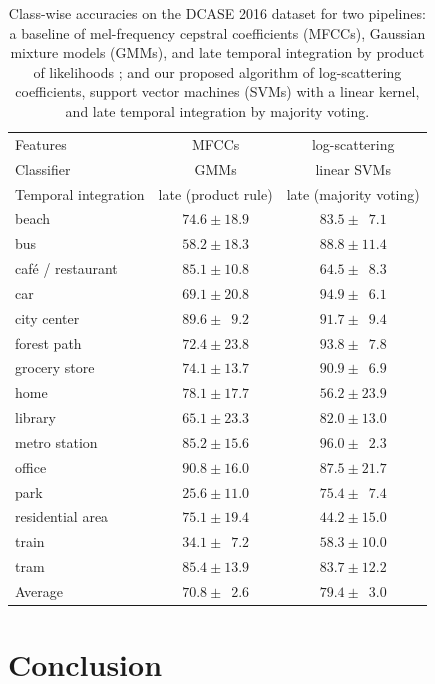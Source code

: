 \documentclass[journal]{IEEEtran}
\begin{document}
\begin{table}
\begin{center}
\begin{tabular}{lcc}
Features & MFCCs & log-scattering \\
Classifier  & GMMs    & linear SVMs \\
Temporal integration & late (product rule) & late (majority voting) \\
\midrule
beach & $74.6 \pm 18.9$ & $83.5 \pm \phantom{0}7.1$ \\
bus & $58.2 \pm 18.3$ & $88.8 \pm 11.4$ \\
caf\'{e} / restaurant & $85.1 \pm 10.8$ & $64.5 \pm \phantom{0}8.3$ \\
car & $69.1 \pm 20.8$ & $94.9 \pm \phantom{0}6.1$ \\
city center & $89.6 \pm \phantom{0}9.2$ & $91.7 \pm \phantom{0}9.4$ \\
forest path & $72.4 \pm 23.8$ & $93.8 \pm \phantom{0}7.8$ \\
grocery store & $74.1 \pm 13.7$ & $90.9 \pm \phantom{0}6.9$ \\
home & $78.1 \pm 17.7$ & $56.2 \pm 23.9$ \\
library & $65.1 \pm 23.3$ & $82.0 \pm 13.0$ \\
metro station & $85.2 \pm 15.6$ & $96.0 \pm \phantom{0}2.3$ \\
office & $90.8 \pm 16.0$ & $87.5 \pm 21.7$ \\
park & $25.6 \pm 11.0$ & $75.4 \pm \phantom{0}7.4$ \\
residential area & $75.1 \pm 19.4$ & $44.2 \pm 15.0$ \\
train & $34.1 \pm \phantom{0}7.2$ & $58.3 \pm 10.0$ \\
tram & $85.4 \pm 13.9$ & $83.7 \pm 12.2$ \\
\bottomrule
Average & $70.8 \pm \phantom{0}2.6$ & $79.4 \pm \phantom{0}3.0$
\end{tabular}
\end{center}
\label{table:dcase2016}
\caption{Class-wise accuracies on the DCASE 2016 dataset for two pipelines: a baseline of mel-frequency cepstral coefficients (MFCCs), Gaussian mixture models (GMMs), and late temporal integration by product of likelihoods ; and our proposed algorithm of log-scattering coefficients, support vector machines (SVMs) with a linear kernel, and late temporal integration by majority voting.}
\end{table}

\section{Conclusion}
\end{document}
